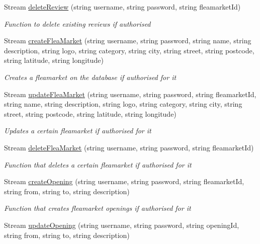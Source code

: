 \begin{DoxyCompactItemize}
Stream \hyperlink{class_service_library_1_1_rest_service_ad0b87d313f13ec52372edafd6cac9c09}{delete\-Review} (string username, string password, string fleamarket\-Id)
\begin{DoxyCompactList}\small\item\em Function to delete existing reviews if authorised \end{DoxyCompactList}\item 
Stream \hyperlink{class_service_library_1_1_rest_service_a39a86dadc6525bee03594f583acff2da}{create\-Flea\-Market} (string username, string password, string name, string description, string logo, string category, string city, string street, string postcode, string latitude, string longitude)
\begin{DoxyCompactList}\small\item\em Creates a fleamarket on the database if authorised for it \end{DoxyCompactList}\item 
Stream \hyperlink{class_service_library_1_1_rest_service_a3e183c1c796a74337fdfac3070036066}{update\-Flea\-Market} (string username, string password, string fleamarket\-Id, string name, string description, string logo, string category, string city, string street, string postcode, string latitude, string longitude)
\begin{DoxyCompactList}\small\item\em Updates a certain fleamarket if authorised for it \end{DoxyCompactList}\item 
Stream \hyperlink{class_service_library_1_1_rest_service_ab502a53d2f520a2b43803a10cb8a93d2}{delete\-Flea\-Market} (string username, string password, string fleamarket\-Id)
\begin{DoxyCompactList}\small\item\em Function that deletes a certain fleamarket if authorised for it \end{DoxyCompactList}\item 
Stream \hyperlink{class_service_library_1_1_rest_service_a4d3293e03679b4d959f342308da43b1f}{create\-Opening} (string username, string password, string fleamarket\-Id, string from, string to, string description)
\begin{DoxyCompactList}\small\item\em Function that creates fleamarket openings if authorised for it \end{DoxyCompactList}\item 
Stream \hyperlink{class_service_library_1_1_rest_service_a1fb0b2b9aabae6add481c8599579044a}{update\-Opening} (string username, string password, string opening\-Id, string from, string to, string description)

\end{DoxyCompactItemize}
